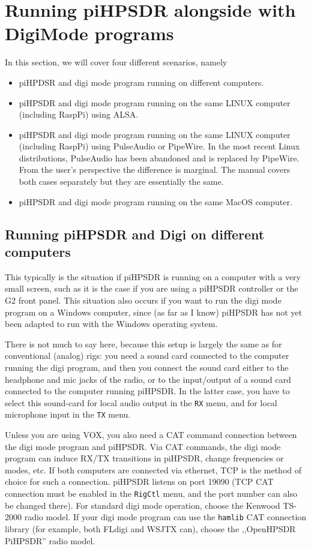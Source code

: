 \documentclass[12pt]{book}
\def\bltt#1{\texttt{\color{blue}#1}}
\def\pH{pi\-HPSDR\xspace}
\begin{document}
\chapter[\pH and digi mode programs]{Running \pH alongside with DigiMode programs}

In this section, we will cover four different scenarios, namely
\begin{itemize}
\item{piHPDSR and digi mode program running on different computers.}
\item{\pH and digi mode program running on the same LINUX computer
(including RaspPi) using ALSA.}
\item{\pH and digi mode program running on the same LINUX computer
(including RaspPi) using PulseAudio or PipeWire. {\color{red} In the most recent Linux distributions,
 PulseAudio has been abandoned and is replaced by
PipeWire. From the user's perspective the difference is marginal.
The manual covers both cases separately but they are essentially the same.}}
\item{\pH and digi mode program running on the same MacOS computer.}
\end{itemize}



\section[\pH and Digi on different computers]{Running \pH and Digi on different computers}

This typically is the situation if \pH is running on a computer with a very small
screen, such as it is the case if you are using a \pH controller or the G2 front panel.
This situation also occurs if you want to run the digi mode program on a Windows computer,
since (as far as I know) \pH has not yet been adapted to run with the Windows operating
system.

There is not much to say here, because this setup is largely the same as for conventional
(analog) rigs: you need a sound card connected to the computer running the digi program,
and then you connect the sound card either to the headphone and mic jacks of the radio,
or to the input/output of a sound card connected to the computer running \pH. In the
latter case, you have to select this sound-card for local audio output in the \bltt{RX} menu,
and for local microphone input in the \bltt{TX} menu.

Unless you are using VOX, you also need a CAT command connection between the digi mode program
and \pH. Via CAT commands, the digi mode program can induce RX/TX transitions in \pH,
change frequencies or modes, etc. If both computers are connected via ethernet,
TCP is the method of choice for such a connection. \pH listens on port 19090 (TCP CAT
connection must be enabled in the \bltt{RigCtl} menu, and the port number can also
be changed there). For standard digi mode operation, choose the
Kenwood TS-2000 radio model. If your digi mode program can use the \texttt{hamlib} CAT connection
library (for example, both FLdigi and WSJTX can), choose the ,,OpenHPSDR PiHPSDR'' radio
model.
\end{document}
